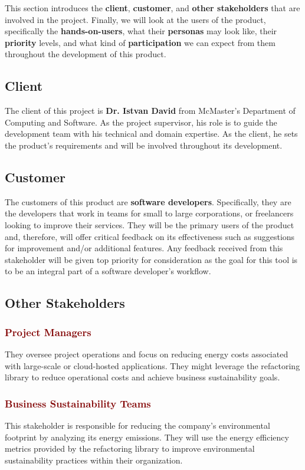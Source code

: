 \documentclass[12pt]{article}
\begin{document}
This section introduces the \textbf{client}, \textbf{customer}, and \textbf{other stakeholders} that are involved in the project. Finally, we will look at the users of the product, specifically the \textbf{hands-on-users}, what their \textbf{personas} may look like, their \textbf{priority} levels, and what kind of \textbf{participation} we can expect from them throughout the development of this product.
\subsection{Client}
The client of this project is \textbf{Dr. Istvan David} from McMaster's Department of Computing and Software. As the project supervisor, his role is to guide the development team with his technical and domain expertise. As the client, he sets the product's requirements and will be involved throughout its development. 
\subsection{Customer}
The customers of this product are \textbf{software developers}. Specifically, they are the developers that work in teams for small to large corporations, or freelancers looking to improve their services. They will be the primary users of the product and, therefore, will offer critical feedback on its effectiveness such as suggestions for improvement and/or additional features. Any feedback received from this stakeholder will be given top priority for consideration as the goal for this tool is to be an integral part of a software developer's workflow.

\subsection{Other Stakeholders}
\subsubsection*{\textcolor{Maroon}{Project Managers}}
They oversee project operations and focus on reducing energy costs associated with large-scale or cloud-hosted applications. They might leverage the refactoring library to reduce operational costs and achieve business sustainability goals.

\subsubsection*{\textcolor{Maroon}{Business Sustainability Teams}}
This stakeholder is responsible for reducing the company's environmental footprint by analyzing its energy emissions. They will use the energy efficiency metrics provided by the refactoring library to improve environmental sustainability practices within their organization.
\end{document}
